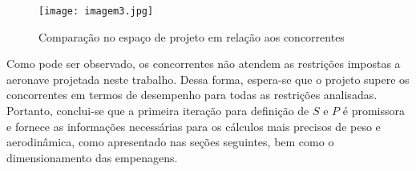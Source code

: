 \begin{figure}[H]
\centering
\texttt{[image: imagem3.jpg]}
\caption[Comparação no espaço de projeto em relação aos concorrentes]{Comparação no espaço de projeto em relação aos concorrentes}
\label{fig:diagr_concorrentes}
\end{figure}

Como pode ser observado, os concorrentes não atendem as restrições impostas a aeronave projetada neste trabalho.
Dessa forma, espera-se que o projeto supere os concorrentes em termos de desempenho para todas as restrições analisadas.
Portanto, conclui-se que a primeira iteração para definição de $S$ e $P$ é promissora e fornece as informações necessárias para os cálculos mais precisos de peso e aerodinâmica, como apresentado nas seções seguintes, bem como o dimensionamento das empenagens.